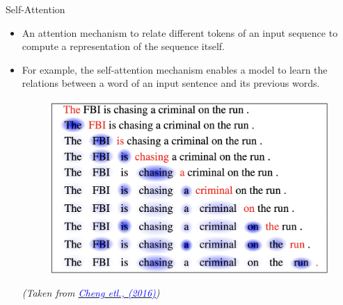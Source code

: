 \begin{frame}{Self-Attention}
\begin{itemize}
    \item  An attention mechanism to relate different tokens of an input sequence to compute a representation of the sequence itself. 
    \item For example, the self-attention mechanism enables a model to learn the relations between a word of an input sentence and its previous words. 
    \begin{figure}
        \centering
        \includegraphics[scale=0.2]{./figure/self_attention.png}
    \end{figure}
    
\vspace*{\fill}
\textit{\tiny{(Taken from 
\href{https://arxiv.org/pdf/1601.06733.pdf}{
\textcolor{blue}{Cheng etl., (2016)}}})}
\end{itemize}
\end{frame}

